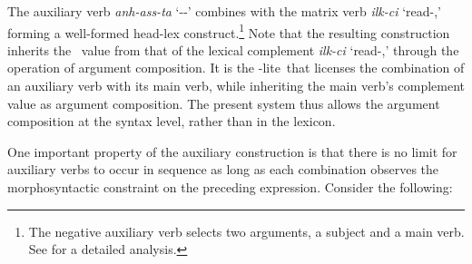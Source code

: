 \documentclass[output=paper]{langsci/langscibook}
\begin{document}
\begin{exe}
\ex \small{}
\end{exe}


\noindent The auxiliary verb \emph{anh-ass-ta} `\NEG-\PST-\DECL' combines with the matrix verb {\it ilk-ci} `read-\conn,'
forming a well-formed head-lex construct.\footnote{The negative auxiliary
verb selects two arguments, a subject and a main verb. See \citet{Kim:16} for
a detailed analysis.}
Note that the resulting construction inherits the
\COMPS\ value from that of the lexical complement {\it ilk-ci} `read-\conn,' through the operation of argument composition.
It is the \hd-lite\ that licenses
the combination of an auxiliary verb with its main verb, while
inheriting the main verb's complement value as argument composition. The present system thus allows the argument composition at the syntax level, rather than
in the lexicon.

One important property of the auxiliary construction is that there is no limit for auxiliary verbs to
occur in sequence as long as each combination observes
the morphosyntactic constraint on the preceding expression. Consider
the following:
\end{document}
